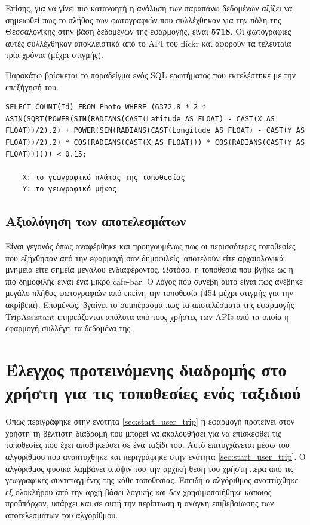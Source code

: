 \documentclass[oneside, 12pt]{book}
\begin{document}
Επίσης, για να γίνει πιο κατανοητή η ανάλυση των παραπάνω δεδομένων 
αξίζει να σημειωθεί πως το πλήθος των φωτογραφιών που συλλέχθηκαν 
για την πόλη της Θεσσαλονίκης στην βάση δεδομένων της εφαρμογής, 
είναι \textbf{5718}. Οι φωτογραφίες αυτές συλλέχθηκαν αποκλειστικά 
από το API του flickr και αφορούν τα τελευταία τρία χρόνια (μέχρι 
στιγμής).

Παρακάτω βρίσκεται το παραδείγμα ενός SQL ερωτήματος που εκτελέστηκε με την επεξήγησή του.
\begin{lstlisting}[caption=SQL ερώτημα για τις φωτογραφίες με χρήση της φόρμουλας Haversine, label=sql_with_haversine]
    SELECT COUNT(Id) FROM Photo WHERE (6372.8 * 2 * ASIN(SQRT(POWER(SIN(RADIANS(CAST(Latitude AS FLOAT) - CAST(X AS FLOAT))/2),2) + POWER(SIN(RADIANS(CAST(Longitude AS FLOAT) - CAST(Y AS FLOAT))/2),2) * COS(RADIANS(CAST(X AS FLOAT))) * COS(RADIANS(CAST(Y AS FLOAT)))))) < 0.15;
    
    X: το γεωγραφικό πλάτος της τοποθεσίας
    Y: το γεωγραφικό μήκος
\end{lstlisting}

\subsection{Αξιολόγηση των αποτελεσμάτων}
Είναι γεγονός όπως αναφέρθηκε και προηγουμένως πως οι περισσότερες 
τοποθεσίες που εξήχθησαν από την εφαρμογή σαν δημοφιλείς, αποτελούν 
είτε αρχαιολογικά μνημεία είτε σημεία μεγάλου ενδιαφέροντος.
Ωστόσο, η τοποθεσία που βγήκε ως η πιο δημοφιλής είναι ένα μικρό 
cafe-bar. Ο λόγος που συνέβη αυτό είναι πως ανέβηκε μεγάλο πλήθος 
φωτογραφιών από εκείνη την τοποθεσία (454 μέχρι στιγμής για την 
ακρίβεια). Επομένως, βγαίνει το συμπέρασμα πως τα αποτελέσματα της 
εφαρμογής TripAssistant επηρεάζονται απόλυτα από τους χρήστες των 
APIs από τα οποία η εφαρμογή συλλέγει τα δεδομένα της.

\section{Έλεγχος προτεινόμενης διαδρομής στο χρήστη για τις τοποθεσίες ενός ταξιδιού}
Όπως περιγράφηκε στην ενότητα \ref{sec:start_user_trip} η εφαρμογή 
προτείνει στον χρήστη τη βέλτιστη διαδρομή που μπορεί να 
ακολουθήσει για να επισκεφθεί τις τοποθεσίες που έχει αποθηκεύσει 
σε ένα ταξίδι του. Αυτό επιτυγχάνεται μέσω του αλγορίθμου που 
αναπτύχθηκε και περιγράφηκε στην ενότητα \ref{sec:start_user_trip}. 
Ο αλγόριθμος φυσικά λαμβάνει υπόψιν του την αρχική θέση του χρήστη 
πέρα από τις γεωγραφικές συντεταγμένες της κάθε τοποθεσίας.
Επειδή ο αλγόριθμος αναπτύχθηκε εξ ολοκλήρου από την αρχή βάσει 
λογικής και δεν χρησιμοποιήθηκε κάποιος προϋπάρχον, υπάρχει και σε 
αυτή την περίπτωση η ανάγκη επιβεβαίωσης των αποτελεσμάτων του 
αλγορίθμου.
\end{document}

